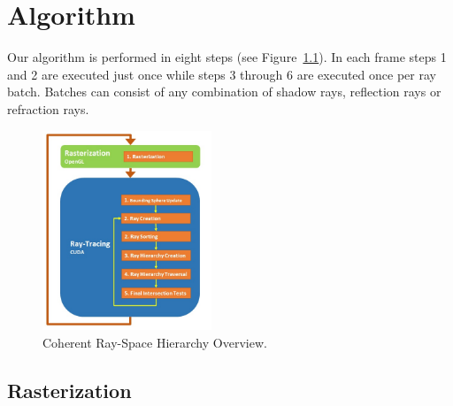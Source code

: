 
\chapter{Algorithm}
\label{chapter:algorithm}

Our algorithm is performed in eight steps (see Figure~\ref{fig:crsh}). In each frame steps 1 and 2 are executed just once while steps 3 through 6 are executed once per ray batch. Batches can consist of any combination of shadow rays, reflection rays or refraction rays.

\begin{figure}[!htb]
    \centering
    \includegraphics[width=0.45\textwidth]{Images/Overview}
    \caption{\label{fig:crsh}Coherent Ray-Space Hierarchy Overview.}
\end{figure}

\section{Rasterization}
\label{section:algorithm-rasterization}

